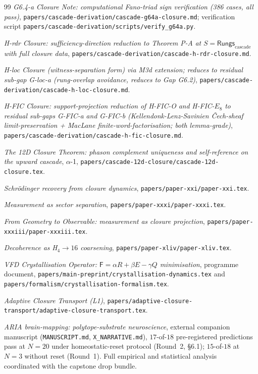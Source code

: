 \documentclass[11pt, a4paper]{amsart}
\theoremstyle{definition}
\newcommand{\Rungs}{\mathsf{Rungs}}
\newcommand{\Fcrystal}{\mathsf{F}}
\begin{document}
\begin{thebibliography}{99}
\emph{G6.4-a Closure Note: computational Fano-triad sign
verification (386 cases, all pass)},
\texttt{papers/cascade-derivation/cascade-g64a-closure.md};
verification script
\texttt{papers/cascade-derivation/scripts/verify\_g64a.py}.

\emph{H-rdr Closure: sufficiency-direction reduction to
Theorem P-A at $S = \Rungs_{\mathrm{cascade}}$ with full
closure data},
\texttt{papers/cascade-derivation/cascade-h-rdr-closure.md}.

\emph{H-loc Closure (witness-separation form) via M3d
extension; reduces to residual sub-gap G-loc-a (rung-overlap
avoidance, reduces to Gap G6.2)},
\texttt{papers/cascade-derivation/cascade-h-loc-closure.md}.

\emph{H-FIC Closure: support-projection reduction of
H-FIC-O and H-FIC-$E_8$ to residual sub-gaps G-FIC-a and
G-FIC-b (Kellendonk-Lenz-Savinien Čech-sheaf limit-preservation
+ MacLane finite-word-factorisation; both lemma-grade)},
\texttt{papers/cascade-derivation/cascade-h-fic-closure.md}.

\emph{The 12D Closure Theorem: phason complement uniqueness and
self-reference on the upward cascade}, $\alpha$-1,
\texttt{papers/cascade-12d-closure/cascade-12d-closure.tex}.

\emph{Schr\"odinger recovery from closure dynamics},
\texttt{papers/paper-xxi/paper-xxi.tex}.

\emph{Measurement as sector separation},
\texttt{papers/paper-xxxi/paper-xxxi.tex}.

\emph{From Geometry to Observable: measurement as closure
projection}, \texttt{papers/paper-xxxiii/paper-xxxiii.tex}.

\emph{Decoherence as H$_4 \to 16$ coarsening},
\texttt{papers/paper-xliv/paper-xliv.tex}.

\emph{VFD Crystallisation Operator: $\Fcrystal = \alpha R +
\beta E - \gamma Q$ minimisation}, programme document,
\texttt{papers/main-preprint/crystallisation-dynamics.tex} and
\texttt{papers/formalism/crystallisation-formalism.tex}.

\emph{Adaptive Closure Transport (L1)},
\texttt{papers/adaptive-closure-transport/adaptive-closure-transport.tex}.

\emph{ARIA brain-mapping: polytope-substrate neuroscience},
external companion manuscript (\texttt{MANUSCRIPT.md},
\texttt{X\_NARRATIVE.md}), $17$-of-$18$ pre-registered
predictions pass at $N{=}20$ under homeostatic-reset protocol
(Round~2, \S 6.1); $15$-of-$18$ at $N{=}3$ without reset (Round~1).
Full empirical and statistical analysis coordinated with the
capstone drop bundle.

\end{thebibliography}
\end{document}
